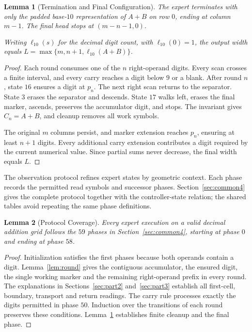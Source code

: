 \documentclass[11pt,a4paper]{article}
\newtheorem{lemma}{Lemma}
\newcommand{\sectiontitle}[2]{\refstepcounter{section}\vspace*{2pt}{\LARGE\bfseries\color{Teal}\thesection\quad #2}\par\vspace{7pt}}
\begin{document}
\begin{lemma}[Termination and Final Configuration]\label{lem:finish}
The expert terminates with only the padded base-$10$ representation of $A+B$
on row $0$, ending at column $m-1$. The final head stops at $(m-n-1,0)$.

Writing $\ell_{10}(s)$ for the decimal digit count, with $\ell_{10}(0)=1$,
the output width equals $L=\max\{m,n+1,\ell_{10}(A+B)\}$.
\end{lemma}
\begin{proof}
Each round consumes one of the $n$ right-operand digits. Every scan crosses
a finite interval, and every carry reaches a digit below $9$ or a blank.
After round $n$, state $16$ ensures a digit at $p_n$. The next right scan
returns to the separator. State $3$ erases the separator and descends.
State $17$ walks left, erases the final marker, ascends, preserves the
accumulator digit, and stops. The invariant gives $C_n=A+B$, and cleanup
removes all work symbols.

The original $m$ columns persist, and marker extension reaches $p_n$,
ensuring at least $n+1$ digits. Every additional carry extension contributes
a digit required by the current numerical value. Since partial sums never
decrease, the final width equals $L$.
\end{proof}

\clearpage
\sectiontitle{3 \enspace OBSERVATION PROTOCOL}{Observation Protocol}\label{sec:common3}
The observation protocol refines expert states by geometric context. Each phase records the permitted read symbols and successor phases. Section~\ref{sec:common4} gives the complete protocol together with the controller-state relation; the shared tables avoid repeating the same phase definitions.

\begin{lemma}[Protocol Coverage]\label{lem:coverage}
Every expert execution on a valid decimal addition grid follows the $59$
phases in Section~\ref{sec:common4}, starting at phase $0$ and ending at phase $58$.
\end{lemma}
\begin{proof}
Initialization satisfies the first phases because both operands contain a digit.
Lemma~\ref{lem:round} gives the contiguous accumulator, the ensured digit,
the single working marker and the remaining right-operand prefix in every
round. The explanations in Sections~\ref{sec:part2} and~\ref{sec:part3} establish all first-cell,
boundary, transport and return readings. The carry rule processes exactly
the digits permitted in phase $50$. Induction over the transitions of each
round preserves these conditions. Lemma~\ref{lem:finish} establishes finite
cleanup and the final phase.
\end{proof}
\end{document}
